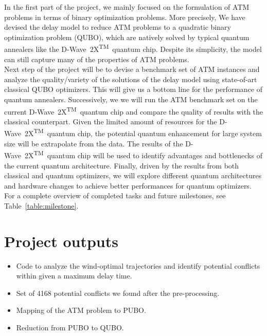 \documentclass[9pt]{extarticle}
\renewcommand{\tablename}{Table}
\newcommand{\DW}{\mbox{D-Wave 2X\textsuperscript{TM}}~}
\begin{document}
In the first part of the project, we mainly focused on the formulation of ATM problems in terms of binary optimization problems. More precisely,
We have devised the delay model to reduce ATM problems to a quadratic binary optimization problem (QUBO), which are natively solved by typical 
quantum annealers like the \DW quantum chip. Despite its simplicity, the model can still capture many of the properties of ATM problems. \\

Next step of the project will be to devise a benchmark set of ATM instances and analyze the quality/variety of the solutions of the delay model using 
state-of-art classical QUBO optimizers. This will give us a bottom line for the performance of quantum annealers. Successively, we 
we will run the ATM benchmark set on the current \DW quantum chip and compare the quality of results with the classical counterpart. Given the limited
amount of resources for the \DW quantum chip, the potential quantum enhancement for large system size will
be extrapolate from the data. The results of the \DW quantum chip will be used to identify advantages and bottlenecks of
the current quantum architecture. Finally, driven by the results from both classical and quantum optimizers, 
we will explore different quantum architectures and hardware changes to achieve better performances for quantum optimizers.\\

For a complete overview of completed tasks and future milestones, see \tablename~\ref{table:milestone}.

\section*{Project outputs}

\begin{itemize}
	\item Code to analyze the wind-optimal trajectories and identify potential conflicts within given a maximum delay time.
	\item Set of 4168 potential conflicts we found after the pre-processing.
	\item Mapping of the ATM problem to PUBO.
	\item Reduction from PUBO to QUBO.
\end{itemize}
\end{document}
